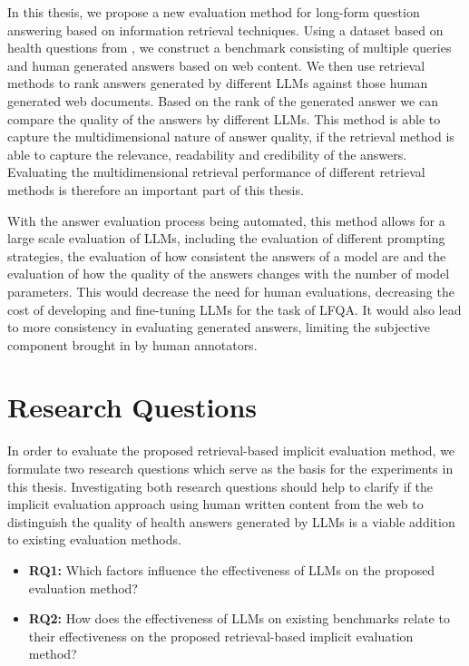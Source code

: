 In this thesis, we propose a new evaluation method for long-form question answering based on information retrieval techniques.
Using a dataset based on health questions from \cite{goeuriot:2021:Consumer}, we construct a benchmark consisting of multiple queries and human generated answers based on web content.
We then use retrieval methods to rank answers generated by different LLMs against those human generated web documents.
Based on the rank of the generated answer we can compare the quality of the answers by different LLMs.
This method is able to capture the multidimensional nature of answer quality, if the retrieval method is able to capture the relevance, readability and credibility of the answers.
Evaluating the multidimensional retrieval performance of different retrieval methods is therefore an important part of this thesis.

With the answer evaluation process being automated, this method allows for a large scale evaluation of LLMs, including the evaluation of different prompting strategies, the evaluation of how consistent the answers of a model are and the evaluation of how the quality of the answers changes with the number of model parameters.
This would decrease the need for human evaluations, decreasing the cost of developing and fine-tuning LLMs for the task of LFQA.
It would also lead to more consistency in evaluating generated answers, limiting the subjective component brought in by human annotators.

\section{Research Questions}\label{sec:research-question}
In order to evaluate the proposed retrieval-based implicit evaluation method, we formulate two research questions which serve as the basis for the experiments in this thesis.
Investigating both research questions should help to clarify if the implicit evaluation approach using human written content from the web to distinguish the quality of health answers generated by LLMs is a viable addition to existing evaluation methods.

\begin{itemize}
    \item \textbf{RQ1:} Which factors influence the effectiveness of LLMs on the proposed evaluation method?
    \item \textbf{RQ2:} How does the effectiveness of LLMs on existing benchmarks relate to their effectiveness on the proposed retrieval-based implicit evaluation method?%
\end{itemize}


